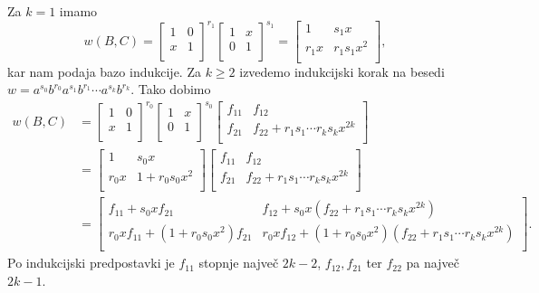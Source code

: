 \begin{dokaz}
    Za $k = 1$ imamo 
\begin{equation*} 
w(B, C) = 
\begin{bmatrix}
    1 & 0 \\
    x & 1 \\
\end{bmatrix}^{r_1} 
\begin{bmatrix}
    1 & x \\
    0 & 1 \\
\end{bmatrix}^{s_1} 
= \begin{bmatrix}
    1 & s_1 x \\
    r_1 x & r_1 s_1 x^2 \\
\end{bmatrix},
\end{equation*}  
kar nam podaja bazo indukcije. Za $k \ge 2$ izvedemo indukcijski korak na besedi $w = a^{s_0} b^{r_0} a^{s_1} b^{r_1} \cdots a^{s_k} b^{r_k}$. 
Tako dobimo
\small
\begin{align*}
    w(B, C) &=  \begin{bmatrix}
        1 & 0 \\
        x & 1 \\
    \end{bmatrix}^{r_0}
    \begin{bmatrix}
        1 & x \\
        0 & 1 \\
    \end{bmatrix}^{s_0}
    \begin{bmatrix}
        f_{11} & f_{12} \\
        f_{21} & f_{22} + r_1 s_1 \cdots r_k s_k x^{2k} \\
    \end{bmatrix} \\ 
    &=  \begin{bmatrix}
        1 & s_0 x \\
        r_0 x & 1 + r_0 s_0 x^2 \\
    \end{bmatrix} 
    \begin{bmatrix}
        f_{11} & f_{12} \\
        f_{21} & f_{22} + r_1 s_1 \cdots r_k s_k x^{2k} \\
    \end{bmatrix} \\
    &=  \begin{bmatrix}
        f_{11} + s_0 x f_{21} & f_{12} + s_0 x (f_{22} + r_1 s_1 \cdots r_k s_k x^{2k}) \\
        r_0 x f_{11} + (1 + r_0 s_0 x^2) f_{21} & r_0 x f_{12} + (1 + r_0 s_0 x^2)(f_{22} + r_1 s_1 \cdots r_k s_k x^{2k}) \\
    \end{bmatrix}.
\end{align*}
\normalsize
Po indukcijski predpostavki je $f_{11}$ stopnje največ $2k - 2$, $f_{12}, f_{21}$ ter $f_{22}$ pa največ $2k - 1$.


\end{dokaz}

